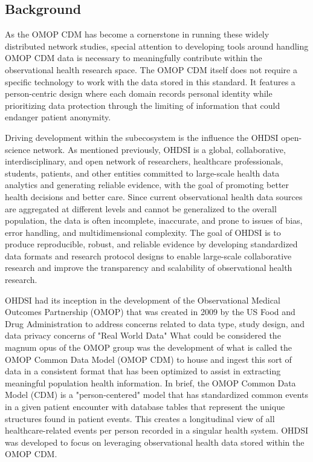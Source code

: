 \documentclass{juliacon}
\begin{document}
\subsection{Background}

As the OMOP CDM has become a cornerstone in running these widely distributed network studies, special attention to developing tools around handling OMOP CDM data is necessary to meaningfully contribute within the observational health research space.
The OMOP CDM itself does not require a specific technology to work with the data stored in this standard.
It features a person-centric design where each domain records personal identity while prioritizing data protection through the limiting of information that could endanger patient anonymity.


Driving development within the subecosystem is the influence the OHDSI open-science network.
As mentioned previously, OHDSI is a global, collaborative, interdisciplinary, and open network of researchers, healthcare professionals, students, patients, and other entities committed to large-scale health data analytics and generating reliable evidence, with the goal of promoting better health decisions and better care. 
Since current observational health data sources are aggregated at different levels and cannot be generalized to the overall population, the data is often incomplete, inaccurate, and prone to issues of bias, error handling, and multidimensional complexity. 
The goal of OHDSI is to produce reproducible, robust, and reliable evidence by developing standardized data formats and research protocol designs to enable large-scale collaborative research and improve the transparency and scalability of observational health research. 

OHDSI had its inception in the development of the Observational Medical Outcomes Partnership (OMOP) that was created in 2009 by the US Food and Drug Administration to address concerns related to data type, study design, and data privacy concerns of "Real World Data" \cite{ohdsi2019book} \cite{FDARealWorldEvidence}
What could be considered the magnum opus of the OMOP group was the development of what is called the OMOP Common Data Model (OMOP CDM) to house and ingest this sort of data in a consistent format that has been optimized to assist in extracting meaningful population health information.
In brief, the OMOP Common Data Model (CDM) is a "person-centered" model that has standardized common events in a given patient encounter with database tables that represent the unique structures found in patient events.
This creates a longitudinal view of all healthcare-related events per person recorded in a singular health system.
OHDSI was developed to focus on leveraging observational health data stored within the OMOP CDM.
\end{document}
